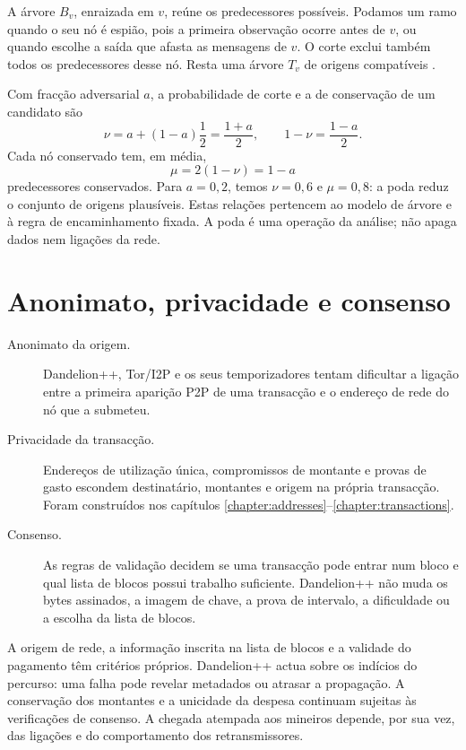 A árvore \(B_v\), enraizada em \(v\), reúne os predecessores possíveis.
Podamos um ramo quando o seu nó é espião, pois a primeira observação ocorre
antes de \(v\), ou quando escolhe a saída que afasta as mensagens de \(v\).
O corte exclui também todos os predecessores desse nó. Resta uma árvore
\(T_v\) de origens compatíveis \cite{dandelion-plus-plus}.

Com fracção adversarial \(a\), a probabilidade de corte e a de conservação
de um candidato são
\[
 \nu=a+(1-a)\frac12=\frac{1+a}{2},
 \qquad 1-\nu=\frac{1-a}{2}.
\]
Cada nó conservado tem, em média,
\[
 \mu=2(1-\nu)=1-a
\]
predecessores conservados. Para \(a=0{,}2\), temos \(\nu=0{,}6\) e
\(\mu=0{,}8\): a poda reduz o conjunto de origens plausíveis. Estas relações
pertencem ao modelo de árvore e à regra de encaminhamento fixada. A poda é
uma operação da análise; não apaga dados nem ligações da rede.


\section{Anonimato, privacidade e consenso}
\label{sec:dandelion-boundaries}

\begin{description}
 \item[Anonimato da origem.] Dandelion++, Tor/I2P e os seus temporizadores
 tentam dificultar a ligação entre a primeira aparição P2P de uma transacção e
 o endereço de rede do nó que a submeteu.
 \item[Privacidade da transacção.] Endereços de utilização única, compromissos
 de montante e provas de gasto escondem destinatário, montantes e origem na
 própria transacção. Foram construídos nos capítulos
 \ref{chapter:addresses}--\ref{chapter:transactions}.
 \item[Consenso.] As regras de validação decidem se uma transacção pode entrar
 num bloco e qual lista de blocos possui trabalho suficiente. Dandelion++ não muda os
 bytes assinados, a imagem de chave, a prova de intervalo, a dificuldade ou a
 escolha da lista de blocos.
\end{description}

A origem de rede, a informação inscrita na lista de blocos e a validade
do pagamento têm critérios próprios. Dandelion++ actua sobre os indícios
do percurso: uma falha pode revelar metadados ou atrasar a propagação.
A conservação dos montantes e a unicidade da despesa continuam sujeitas
às verificações de consenso. A chegada atempada aos mineiros depende,
por sua vez, das ligações e do comportamento dos retransmissores.


